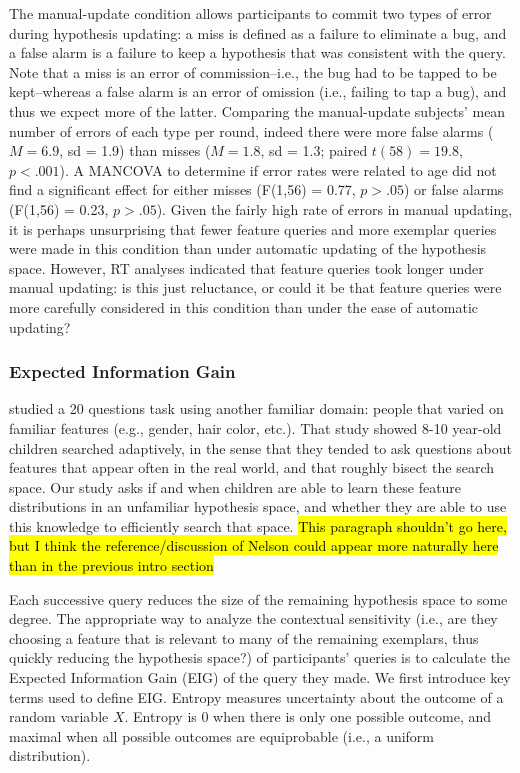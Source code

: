 \documentclass[10pt,letterpaper]{article}
\begin{document}
The manual-update condition allows participants to commit two types of error during 
hypothesis updating: a miss is defined as a failure to eliminate a bug, and a false 
alarm is a failure to keep a hypothesis that was consistent with the query. Note that 
a miss is an error of commission--i.e., the bug had to be tapped to be kept--whereas 
a false alarm is an error of omission (i.e., failing to tap a bug), and thus we expect 
more of the latter. Comparing the manual-update subjects' mean number of errors of 
each type per round, indeed there were more false alarms ($M=6.9$, sd = 1.9) than 
misses ($M=1.8$, sd = 1.3; paired $t(58) = 19.8$, $p<.001$). A MANCOVA to 
determine if error rates were related to age did not find a significant effect for either 
misses (F(1,56) = 0.77, $p>.05$) or false alarms (F(1,56) = 0.23, $p>.05$). Given 
the fairly high rate of errors in manual updating, it is perhaps unsurprising that fewer 
feature queries and more exemplar queries were made in this condition than under 
automatic updating of the hypothesis space. However, RT analyses indicated that 
feature queries took longer under manual updating: is this just reluctance, or could it 
be that feature queries were more carefully considered in this condition than under 
the ease of automatic updating? 

\subsubsection{Expected Information Gain}

 studied a 20 questions task using another familiar domain: 
people that varied on familiar features (e.g., gender, hair color, etc.). That study 
showed 8-10 year-old children searched adaptively, in the sense that they tended to 
ask questions about features that appear often in the real world, and that roughly 
bisect the search space. Our study asks if and when children are able to learn these 
feature distributions in an unfamiliar hypothesis space, and whether they are able to 
use this knowledge to efficiently search that space.
\hl{This paragraph shouldn't go here, but I think the reference/discussion of
Nelson could appear more naturally here than in the previous intro section}

Each successive query reduces the size of the remaining hypothesis space to some 
degree. The appropriate way to analyze the contextual sensitivity (i.e., are they 
choosing a feature that is relevant to many of the remaining exemplars, thus quickly 
reducing the hypothesis space?) of participants' queries is to calculate the Expected 
Information Gain (EIG) of the query they made. We first introduce key terms used to 
define EIG. Entropy measures uncertainty about the outcome of a random variable 
$X$. Entropy is 0 when there is only one possible outcome, and maximal when all 
possible outcomes are equiprobable (i.e., a uniform distribution).
\end{document}
